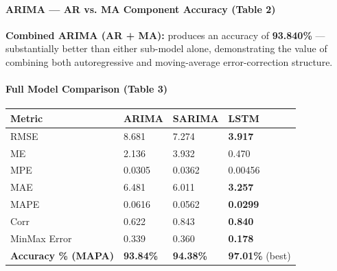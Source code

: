 \documentclass[12pt,openany]{book}
\begin{document}
\paragraph{ARIMA --- AR vs. MA Component Accuracy (Table 2)}

\begin{center}
\end{center}

\textbf{Combined ARIMA (AR + MA):} produces an accuracy of \textbf{93.840\%} --- substantially better than either sub-model alone, demonstrating the value of combining both autoregressive and moving-average error-correction structure.

\paragraph{Full Model Comparison (Table 3)}

\begin{center}
\small
\begin{tabular}{|L{0.16\textwidth}|L{0.22\textwidth}|L{0.22\textwidth}|L{0.28\textwidth}|}
\hline
Metric & \textbf{ARIMA} & \textbf{SARIMA} & \textbf{LSTM} \\
\hline
RMSE & 8.681 & 7.274 & \textbf{3.917} \\
\hline
ME & 2.136 & 3.932 & 0.470 \\
\hline
MPE & 0.0305 & 0.0362 & 0.00456 \\
\hline
MAE & 6.481 & 6.011 & \textbf{3.257} \\
\hline
MAPE & 0.0616 & 0.0562 & \textbf{0.0299} \\
\hline
Corr & 0.622 & 0.843 & \textbf{0.840} \\
\hline
MinMax Error & 0.339 & 0.360 & \textbf{0.178} \\
\hline
\textbf{Accuracy \% (MAPA)} & \textbf{93.84\%} & \textbf{94.38\%} & \textbf{97.01\%} (best) \\
\hline
\end{tabular}
\normalsize
\end{center}
\end{document}
